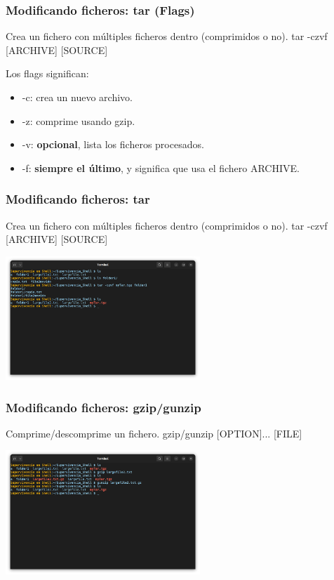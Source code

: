 \documentclass[10pt]{beamer}
\begin{document}
	\begin{frame}
		\frametitle{Modificando ficheros: tar (Flags)}
		\begin{alertblock}{Crea un fichero con múltiples ficheros dentro (comprimidos o no).}
			tar -czvf [ARCHIVE] [SOURCE]
		\end{alertblock}
		Los flags significan:
		\begin{itemize}
			\item -c: crea un nuevo archivo.
			\item -z: comprime usando gzip.
			\item -v: \textbf{opcional}, lista los ficheros procesados.
			\item -f: \textbf{siempre el último}, y significa que usa el fichero ARCHIVE.
		\end{itemize}
	\end{frame}
	
	\begin{frame}
		\frametitle{Modificando ficheros: tar}
		\begin{alertblock}{Crea un fichero con múltiples ficheros dentro (comprimidos o no).}
			tar -czvf [ARCHIVE] [SOURCE]
		\end{alertblock}
		\begin{center}
			\includegraphics[width=0.55\textwidth]{tar}
		\end{center}
	\end{frame}
	
	\begin{frame}
		\frametitle{Modificando ficheros: gzip/gunzip}
		\begin{alertblock}{Comprime/descomprime un fichero.}
			gzip/gunzip [OPTION]... [FILE]
		\end{alertblock}
		\begin{center}
			\includegraphics[width=0.55\textwidth]{gzip}
		\end{center}
	\end{frame}
		
\end{document}
